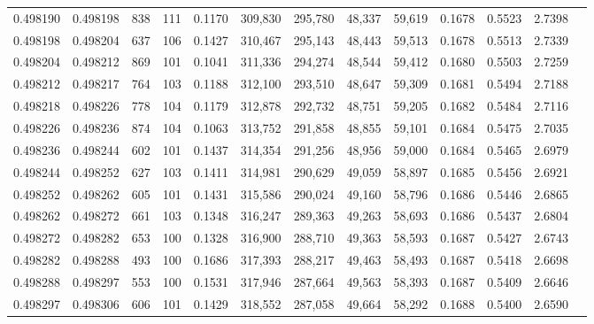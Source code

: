\begin{tabular}{rrrrrrrrrrrrr}
0.498190 & 0.498198 &   838 & 111 &                                     0.1170 & 309,830 & 295,780 &  48,337 &  59,619 & 0.1678 & 0.5523 & 2.7398 \\
0.498198 & 0.498204 &   637 & 106 &                                     0.1427 & 310,467 & 295,143 &  48,443 &  59,513 & 0.1678 & 0.5513 & 2.7339 \\
0.498204 & 0.498212 &   869 & 101 &                                     0.1041 & 311,336 & 294,274 &  48,544 &  59,412 & 0.1680 & 0.5503 & 2.7259 \\
0.498212 & 0.498217 &   764 & 103 &                                     0.1188 & 312,100 & 293,510 &  48,647 &  59,309 & 0.1681 & 0.5494 & 2.7188 \\
0.498218 & 0.498226 &   778 & 104 &                                     0.1179 & 312,878 & 292,732 &  48,751 &  59,205 & 0.1682 & 0.5484 & 2.7116 \\
0.498226 & 0.498236 &   874 & 104 &                                     0.1063 & 313,752 & 291,858 &  48,855 &  59,101 & 0.1684 & 0.5475 & 2.7035 \\
0.498236 & 0.498244 &   602 & 101 &                                     0.1437 & 314,354 & 291,256 &  48,956 &  59,000 & 0.1684 & 0.5465 & 2.6979 \\
0.498244 & 0.498252 &   627 & 103 &                                     0.1411 & 314,981 & 290,629 &  49,059 &  58,897 & 0.1685 & 0.5456 & 2.6921 \\
0.498252 & 0.498262 &   605 & 101 &                                     0.1431 & 315,586 & 290,024 &  49,160 &  58,796 & 0.1686 & 0.5446 & 2.6865 \\
0.498262 & 0.498272 &   661 & 103 &                                     0.1348 & 316,247 & 289,363 &  49,263 &  58,693 & 0.1686 & 0.5437 & 2.6804 \\
0.498272 & 0.498282 &   653 & 100 &                                     0.1328 & 316,900 & 288,710 &  49,363 &  58,593 & 0.1687 & 0.5427 & 2.6743 \\
0.498282 & 0.498288 &   493 & 100 &                                     0.1686 & 317,393 & 288,217 &  49,463 &  58,493 & 0.1687 & 0.5418 & 2.6698 \\
0.498288 & 0.498297 &   553 & 100 &                                     0.1531 & 317,946 & 287,664 &  49,563 &  58,393 & 0.1687 & 0.5409 & 2.6646 \\
0.498297 & 0.498306 &   606 & 101 &                                     0.1429 & 318,552 & 287,058 &  49,664 &  58,292 & 0.1688 & 0.5400 & 2.6590 \\

\end{tabular}
